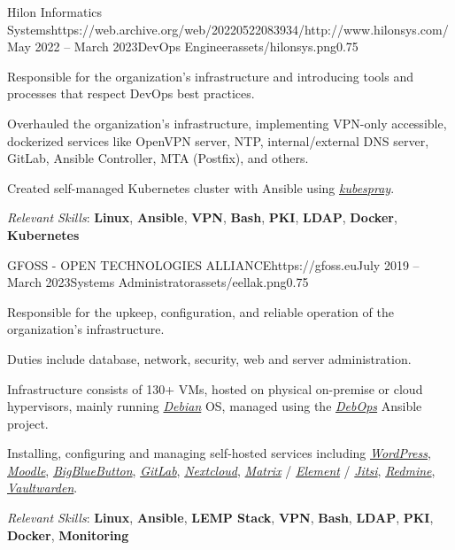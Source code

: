 \documentclass{mycv}
\begin{document}
	\begin{EntryDatedLogo}{Hilon Informatics Systems}{https://web.archive.org/web/20220522083934/http://www.hilonsys.com/}{May 2022 -- March 2023}{DevOps Engineer}{assets/hilonsys.png}{0.75}
		\begin{Itemize}
			\item Responsible for the organization's infrastructure and introducing tools and processes that respect DevOps best practices.
			\item Overhauled the organization's infrastructure, implementing VPN-only accessible, dockerized services like OpenVPN server, NTP, internal/external DNS server, GitLab, Ansible Controller, MTA (Postfix), and others.
			\item Created self-managed Kubernetes cluster with Ansible using \href{https://kubespray.io/}{\textit{kubespray}}.
			\item \textit{Relevant Skills}: \textbf{Linux}, \textbf{Ansible}, \textbf{VPN}, \textbf{Bash}, \textbf{PKI}, \textbf{LDAP}, \textbf{Docker}, \textbf{Kubernetes}
		\end{Itemize}
	\end{EntryDatedLogo}

	\vspace{0.5cm}

	\begin{EntryDatedLogo}{GFOSS - OPEN TECHNOLOGIES ALLIANCE}{https://gfoss.eu}{July 2019 -- March 2023}{Systems Administrator}{assets/eellak.png}{0.75}
		\begin{Itemize}
			\item Responsible for the upkeep, configuration, and reliable operation of the organization's infrastructure.
			\item Duties include database, network, security, web and server administration.
			\item Infrastructure consists of 130+ VMs, hosted on physical on-premise or cloud hypervisors, mainly running \href{https://www.debian.org}{\textit{Debian}} OS, managed using the \href{https://debops.org}{\textit{DebOps}} Ansible project.
			\item Installing, configuring and managing self-hosted services including \href{https://wordpress.com}{\textit{WordPress}}, \href{https://moodle.org}{\textit{Moodle}}, \href{https://bigbluebutton.org}{\textit{BigBlueButton}}, \href{https://about.gitlab.com/install/}{\textit{GitLab}}, \href{https://nextcloud.com}{\textit{Nextcloud}}, \href{https://matrix.org}{\textit{Matrix}} / \href{https://element.io}{\textit{Element}} / \href{https://jitsi.org}{\textit{Jitsi}}, \href{https://www.redmine.org/}{\textit{Redmine}}, \href{https://vaultwarden.discourse.group/}{\textit{Vaultwarden}}.
			\item \textit{Relevant Skills}: \textbf{Linux}, \textbf{Ansible}, \textbf{LEMP Stack}, \textbf{VPN}, \textbf{Bash}, \textbf{LDAP}, \textbf{PKI}, \textbf{Docker}, \textbf{Monitoring}
  \end{Itemize}
	\end{EntryDatedLogo}
\end{document}
